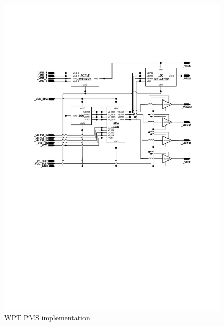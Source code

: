 \documentclass[12pt,a4paper,UKenglish]{report}
\begin{document}
\begin{figure} [H]
  \centering
  \includegraphics[width=\textwidth]{img/visio/visio_pms.pdf} 
 \caption{WPT PMS implementation} 
\label{fig:wpt_top} 
\end{figure}
\end{document}
